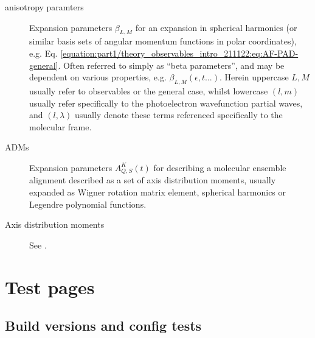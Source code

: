 \documentclass[letterpaper,table,10pt,english]{jupyterBook}
\begin{document}
\begin{description}
\item[{anisotropy paramters\label{\detokenize{backmatter/glossary:term-anisotropy-paramters}}}] \leavevmode
\sphinxAtStartPar
Expansion parameters \(\beta_{L,M}\) for an expansion in spherical harmonics (or similar basis sets of angular momentum functions in polar coordinates), e.g. Eq. \eqref{equation:part1/theory_observables_intro_211122:eq:AF-PAD-general}. Often referred to simply as “beta parameters”, and may be dependent on various properties, e.g. \(\beta_{L,M}(\epsilon,t...)\). Herein upper\sphinxhyphen{}case \(L,M\) usually refer to observables or the general case, whilst lower\sphinxhyphen{}case \((l,m)\) usually refer specifically to the photoelectron wavefunction partial waves, and \((l,\lambda)\) usually denote these terms referenced specifically to the molecular frame.

\item[{ADMs\label{\detokenize{backmatter/glossary:term-ADMs}}}] \leavevmode
\sphinxAtStartPar
Expansion parameters \(A_{Q,S}^{K}(t)\) for describing a molecular ensemble alignment described as a set of axis distribution moments, usually expanded as Wigner rotation matrix element, spherical harmonics or Legendre polynomial functions.

\item[{Axis distribution moments\label{\detokenize{backmatter/glossary:term-Axis-distribution-moments}}}] \leavevmode
\sphinxAtStartPar
See {\hyperref[\detokenize{backmatter/glossary:term-ADMs}]{}}.

\end{description}

\sphinxstepscope


\part{Test pages}

\sphinxstepscope


\chapter{Build versions and config tests}
\label{\detokenize{tests/build_versions_checks:build-versions-and-config-tests}}\label{\detokenize{tests/build_versions_checks::doc}}
\end{document}
